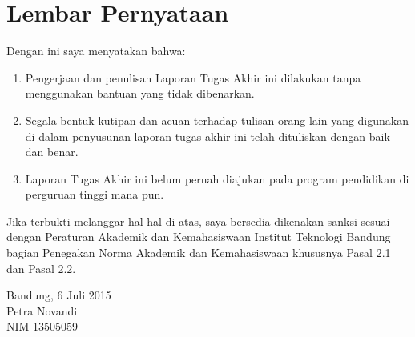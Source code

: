 %
%
%
%
%

\chapter*{Lembar Pernyataan}

Dengan ini saya menyatakan bahwa:

\begin{enumerate}

    \item Pengerjaan dan penulisan Laporan Tugas Akhir ini dilakukan tanpa menggunakan bantuan yang tidak dibenarkan.
    \item Segala bentuk kutipan dan acuan terhadap tulisan orang lain yang digunakan di dalam penyusunan laporan tugas akhir ini telah dituliskan dengan baik dan benar.
    \item Laporan Tugas Akhir ini belum pernah diajukan pada program pendidikan di perguruan tinggi mana pun.

\end{enumerate}

Jika terbukti melanggar hal-hal di atas, saya bersedia dikenakan sanksi sesuai dengan Peraturan Akademik dan Kemahasiswaan Institut Teknologi Bandung bagian Penegakan Norma Akademik dan Kemahasiswaan khususnya Pasal 2.1 dan Pasal 2.2.
\vspace{15mm}

Bandung, 6 Juli 2015 \\
Petra Novandi \\
NIM 13505059
